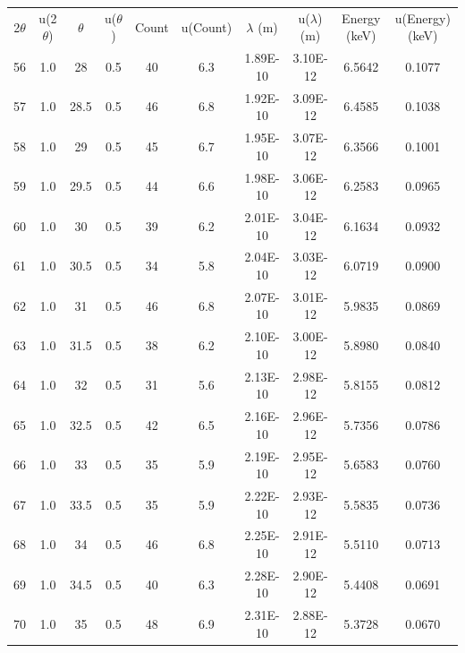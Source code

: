 \begin{maintable}[ht]
\center
\begin{tabular}{cccccccccc}
2$\theta$ & u(2$\theta$) & $\theta$ & u($\theta$) & Count & u(Count) & $\lambda$ (m) & u($\lambda$) (m) & Energy (keV) & u(Energy) (keV) \\
56        & 1.0 & 28       & 0.5         & 40    & 6.3      & 1.89E-10      & 3.10E-12         & 6.5642       & 0.1077 \\
57        & 1.0 & 28.5     & 0.5         & 46    & 6.8      & 1.92E-10      & 3.09E-12         & 6.4585       & 0.1038 \\
58        & 1.0 & 29       & 0.5         & 45    & 6.7      & 1.95E-10      & 3.07E-12         & 6.3566       & 0.1001 \\
59        & 1.0 & 29.5     & 0.5         & 44    & 6.6      & 1.98E-10      & 3.06E-12         & 6.2583       & 0.0965 \\
60        & 1.0 & 30       & 0.5         & 39    & 6.2      & 2.01E-10      & 3.04E-12         & 6.1634       & 0.0932 \\
61        & 1.0 & 30.5     & 0.5         & 34    & 5.8      & 2.04E-10      & 3.03E-12         & 6.0719       & 0.0900 \\
62        & 1.0 & 31       & 0.5         & 46    & 6.8      & 2.07E-10      & 3.01E-12         & 5.9835       & 0.0869 \\
63        & 1.0 & 31.5     & 0.5         & 38    & 6.2      & 2.10E-10      & 3.00E-12         & 5.8980       & 0.0840 \\
64        & 1.0 & 32       & 0.5         & 31    & 5.6      & 2.13E-10      & 2.98E-12         & 5.8155       & 0.0812 \\
65        & 1.0 & 32.5     & 0.5         & 42    & 6.5      & 2.16E-10      & 2.96E-12         & 5.7356       & 0.0786 \\
66        & 1.0 & 33       & 0.5         & 35    & 5.9      & 2.19E-10      & 2.95E-12         & 5.6583       & 0.0760 \\
67        & 1.0 & 33.5     & 0.5         & 35    & 5.9      & 2.22E-10      & 2.93E-12         & 5.5835       & 0.0736 \\
68        & 1.0 & 34       & 0.5         & 46    & 6.8      & 2.25E-10      & 2.91E-12         & 5.5110       & 0.0713 \\
69        & 1.0 & 34.5     & 0.5         & 40    & 6.3      & 2.28E-10      & 2.90E-12         & 5.4408       & 0.0691 \\
70        & 1.0 & 35       & 0.5         & 48    & 6.9      & 2.31E-10      & 2.88E-12         & 5.3728       & 0.0670 \\

\end{tabular}
\end{maintable}

